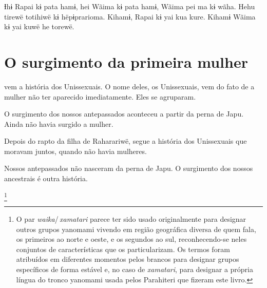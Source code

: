 
Ɨhɨ Rapai kɨ pata hamɨ, hei Wãima kɨ pata hamɨ, Wãima pei ma kɨ wãha.
Hehu tirewë totihiwë kɨ hëpɨprarioma. Kihamɨ, Rapai kɨ yai kua kure.
Kihamɨ Wãima kɨ yai kuwë he torewë. 

\chapter{O surgimento da primeira mulher}
 
 vem a história dos Unissexuais. O nome deles, os Unissexuais, vem
do fato de a mulher não ter aparecido imediatamente. Eles se agruparam. 

O surgimento dos nossos antepassados aconteceu a partir da perna de
Japu. Ainda não havia surgido a mulher. 

Depois do rapto da filha de Raharariwë, segue a história dos Unissexuais
que moravam juntos, quando não havia mulheres. 



Nossos antepassados não nasceram da perna de Japu. O surgimento dos
nossos ancestrais é outra história. 

\footnote{O par \textit{waika}/\,\textit{xamatari} parece ter sido usado originalmente para designar outros grupos yanomami vivendo em região geográfica diversa de quem fala, os primeiros ao norte e oeste, e os segundos ao sul, reconhecendo-se neles conjuntos de características que os particularizam. Os termos foram atribuídos em diferentes momentos pelos brancos para designar grupos específicos de forma estável e, no caso de \textit{xamatari}, para designar a própria língua do tronco yanomami usada pelos Parahiteri que fizeram este livro.} 

